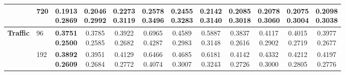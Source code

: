 \begin{longtable}{@{}llcccccccccc@{}}
 & 720 & \shortstack{\colorbox[gray]{0.82}{\textbf{0.1913}}\\\colorbox[gray]{0.82}{\textbf{0.2869}}} & \shortstack{\colorbox[gray]{0.92}{0.2046}\\\colorbox[gray]{0.92}{0.2992}} & \shortstack{0.2273\\0.3119} & \shortstack{0.2578\\0.3496} & \shortstack{0.2455\\0.3283} & \shortstack{0.2142\\0.3140} & \shortstack{0.2085\\0.3018} & \shortstack{0.2078\\0.3060} & \shortstack{0.2075\\0.3004} & \shortstack{0.2098\\0.3038} \\ \hline

\textbf{Traffic} & 96 & \shortstack{\colorbox[gray]{0.82}{\textbf{0.3751}}\\\colorbox[gray]{0.82}{\textbf{0.2500}}} & \shortstack{\colorbox[gray]{0.92}{0.3785}\\\colorbox[gray]{0.92}{0.2585}} & \shortstack{0.3922\\0.2682} & \shortstack{0.6965\\0.4287} & \shortstack{0.4589\\0.2983} & \shortstack{0.5887\\0.3148} & \shortstack{0.3837\\0.2616} & \shortstack{0.4117\\0.2902} & \shortstack{0.4015\\0.2719} & \shortstack{0.3977\\0.2677} \\ \cline{2-12}

 & 192 & \shortstack{\colorbox[gray]{0.82}{\textbf{0.3892}}\\\colorbox[gray]{0.82}{\textbf{0.2609}}} & \shortstack{\colorbox[gray]{0.92}{0.3951}\\\colorbox[gray]{0.92}{0.2684}} & \shortstack{0.4129\\0.2772} & \shortstack{0.6466\\0.4074} & \shortstack{0.4685\\0.3007} & \shortstack{0.6181\\0.3243} & \shortstack{0.4142\\0.2726} & \shortstack{0.4332\\0.3000} & \shortstack{0.4212\\0.2805} & \shortstack{0.4197\\0.2776} \\ \cline{2-12}


\end{longtable}

